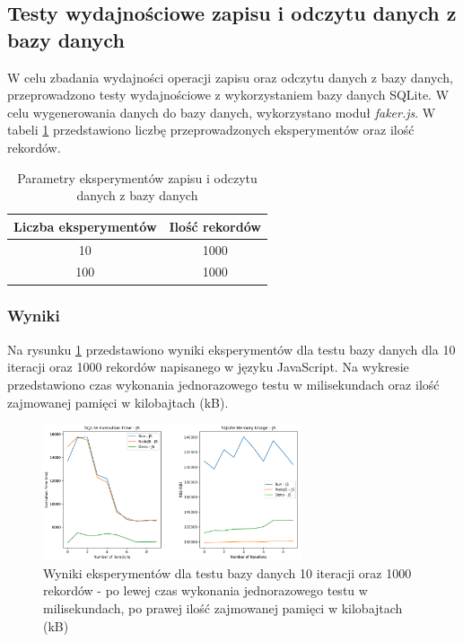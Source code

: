 \subsection{Testy wydajnościowe zapisu i odczytu danych z bazy danych}
W celu zbadania wydajności operacji zapisu oraz odczytu danych z bazy danych, przeprowadzono testy wydajnościowe z wykorzystaniem bazy danych SQLite. W celu wygenerowania danych do bazy danych, wykorzystano moduł \textit{faker.js}. W tabeli \ref{tab:database_experiments} przedstawiono liczbę przeprowadzonych eksperymentów oraz ilość rekordów.

\begin{table}[H]
  \centering
  \caption{Parametry eksperymentów zapisu i odczytu danych z bazy danych}
  \begin{tabular}{|c|c|}
    \hline
    \textbf{Liczba eksperymentów} & \textbf{Ilość rekordów}\\ \hline
    10 & 1000 \\ \hline
    100 & 1000 \\ \hline
  \end{tabular}
  \label{tab:database_experiments}
\end{table}

\subsubsection{Wyniki}
Na rysunku \ref{fig:database_e1_js} przedstawiono wyniki eksperymentów dla testu bazy danych dla 10 iteracji oraz 1000 rekordów napisanego w języku JavaScript. Na wykresie przedstawiono czas wykonania jednorazowego testu w milisekundach oraz ilość zajmowanej pamięci w kilobajtach (kB).

\begin{figure}[H]
  \centering
  \includegraphics[width=0.68\textwidth]{Figures/database/sqlite_10_1000_js.png}
  \caption{Wyniki eksperymentów dla testu bazy danych 10 iteracji oraz 1000 rekordów - po lewej czas wykonania jednorazowego testu w milisekundach, po prawej ilość zajmowanej pamięci w kilobajtach (kB)}
  \label{fig:database_e1_js}
\end{figure}

